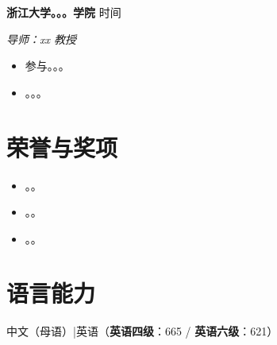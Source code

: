\documentclass[10pt,a4paper]{article}
\newcommand{\entry}[2]{%
  \noindent\textbf{#1}\hfill{#2}\par
}
\begin{document}
\entry{\textbf{浙江大学。。。学院 }}{时间}
\textit{导师：xx 教授}\
\begin{itemize}
  \item 参与。。。
  \item 。。。
\end{itemize}

\section{荣誉与奖项}
\begin{itemize}
  \item 。。
  \item 。。
  \item 。。
\end{itemize}

\section{语言能力}
中文（母语）\quad|\quad 英语（\textbf{英语四级}：665 / \textbf{英语六级}：621）
\end{document}
